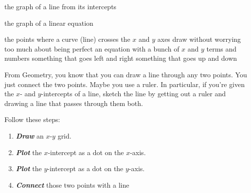 \documentclass[fleqn,letterpaper,12pt,printwatermark=false]{memoir}
\begin{document}
\newcommand{\myClassName}{Pre-AP Algebra 2}
\newcommand{\myUnitNumber}{1}
\newcommand{\myUnitTitle}{Introduction to Functions}
\newcommand{\myLessonNumber}{7}
\newcommand{\myLessonTitle}{Graphing Linear Equations}



\pagestyle{myPagestyle}

\checkandfixthelayout
{}

\begin{myNotesHeader}
    \item {} the graph of a line from its intercepts
    \item {} the graph of a linear equation
\end{myNotesHeader}

\begin{myVocabulary}
        {
            the points where a curve (line) crosses the $x$ and $y$ axes
        }
        {
            draw without worrying too much about being perfect
        }
        {
            an equation with a bunch of $x$ and $y$ terms and numbers
        }
        {
            something that goes left and right
        }
        {
            something that goes up and down
        }
\end{myVocabulary}

\begin{myLesson}[][1]
    From Geometry, you know that 
    you can draw a line through any two points.
    You just connect the two points.
    Maybe you use a ruler.
    In particular, if you're given the $x$- and $y$-intercepts
    of a line, sketch the line 
    by getting out a ruler and drawing a line that passes 
    through them both.
\end{myLesson}

\begin{myKeyConcepts}
    Follow these steps:
    \begin{enumerate}
        \item {\bfseries\itshape Draw} an $x$-$y$ grid.
        \item {\bfseries\itshape Plot} the $x$-intercept as a dot on the $x$-axis.
        \item {\bfseries\itshape Plot} the $y$-intercept as a dot on the $y$-axis.
        \item {\bfseries\itshape Connect} those two points with a line
    \end{enumerate}
\end{myKeyConcepts}
\end{document}
